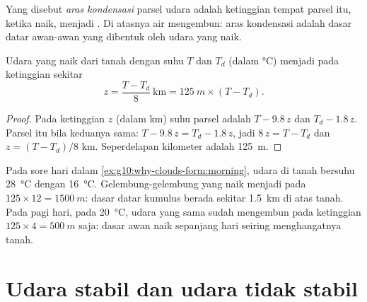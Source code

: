 \begin{definition}\label{def:g10:why-clouds-form:condensation-level}
Yang disebut \emph{aras kondensasi} parsel udara adalah
ketinggian tempat parsel itu, ketika naik, menjadi . Di atasnya air
mengembun: aras kondensasi adalah dasar datar awan-awan yang dibentuk oleh
udara yang naik.
\end{definition}

\begin{proposition}\label{prop:g10:why-clouds-form:lcl}
Udara yang naik dari tanah dengan suhu $T$ dan  $T_d$
(dalam \unit{\degreeCelsius}) menjadi  pada ketinggian sekitar
\[
  z = \frac{T - T_d}{8}\ \text{km} = \qty{125}{m} \times (T - T_d).
\]
\end{proposition}

\begin{proof}
Pada ketinggian $z$ (dalam km) suhu parsel adalah $T - 9.8\,z$ dan  $T_d - 1.8\,z$. Parsel itu  bila keduanya sama:
$T - 9.8\,z = T_d - 1.8\,z$, jadi $8\,z = T - T_d$ dan $z = (T - T_d)/8$ km.
Seperdelapan kilometer adalah \qty{125}{m}.
\end{proof}

\begin{example}\label{ex:g10:why-clouds-form:base}
Pada sore hari dalam \cref{ex:g10:why-clouds-form:morning}, udara di tanah
bersuhu \qty{28}{\degreeCelsius} dengan 
\qty{16}{\degreeCelsius}. Gelembung-gelembung yang naik menjadi  pada
$125 \times 12 = \qty{1500}{m}$: dasar datar kumulus berada sekitar
\qty{1.5}{km} di atas tanah. Pada pagi hari, pada \qty{20}{\degreeCelsius},
udara yang sama sudah mengembun pada ketinggian $125 \times 4 = \qty{500}{m}$
saja: dasar awan naik sepanjang hari seiring menghangatnya tanah.
\end{example}

\section{Udara stabil dan udara tidak stabil}

